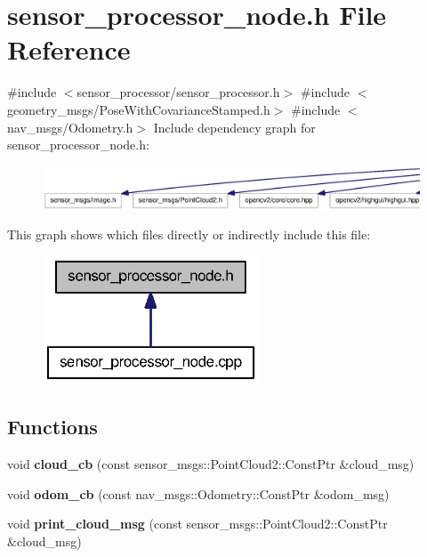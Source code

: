 \section{sensor\-\_\-processor\-\_\-node.\-h \-File \-Reference}
\label{sensor__processor__node_8h}
{\ttfamily \#include $<$sensor\-\_\-processor/sensor\-\_\-processor.\-h$>$}\*
{\ttfamily \#include $<$geometry\-\_\-msgs/\-Pose\-With\-Covariance\-Stamped.\-h$>$}\*
{\ttfamily \#include $<$nav\-\_\-msgs/\-Odometry.\-h$>$}\*
\-Include dependency graph for sensor\-\_\-processor\-\_\-node.\-h\-:\nopagebreak
\begin{figure}[H]
\begin{center}
\leavevmode
\includegraphics[width=350pt]{sensor__processor__node_8h__incl}
\end{center}
\end{figure}
\-This graph shows which files directly or indirectly include this file\-:\nopagebreak
\begin{figure}[H]
\begin{center}
\leavevmode
\includegraphics[width=182pt]{sensor__processor__node_8h__dep__incl}
\end{center}
\end{figure}
\subsection*{\-Functions}
\begin{DoxyCompactItemize}
\item 
void {\bf cloud\-\_\-cb} (const sensor\-\_\-msgs\-::\-Point\-Cloud2\-::\-Const\-Ptr \&cloud\-\_\-msg)
\item 
void {\bf odom\-\_\-cb} (const nav\-\_\-msgs\-::\-Odometry\-::\-Const\-Ptr \&odom\-\_\-msg)
\item 
void {\bf print\-\_\-cloud\-\_\-msg} (const sensor\-\_\-msgs\-::\-Point\-Cloud2\-::\-Const\-Ptr \&cloud\-\_\-msg)
\end{DoxyCompactItemize}
